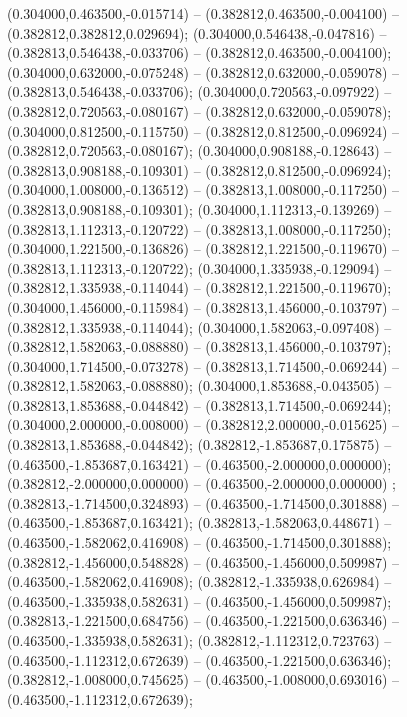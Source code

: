  (0.304000,0.463500,-0.015714) -- (0.382812,0.463500,-0.004100) -- (0.382812,0.382812,0.029694);
 (0.304000,0.546438,-0.047816) -- (0.382813,0.546438,-0.033706) -- (0.382812,0.463500,-0.004100);
 (0.304000,0.632000,-0.075248) -- (0.382812,0.632000,-0.059078) -- (0.382813,0.546438,-0.033706);
 (0.304000,0.720563,-0.097922) -- (0.382812,0.720563,-0.080167) -- (0.382812,0.632000,-0.059078);
 (0.304000,0.812500,-0.115750) -- (0.382812,0.812500,-0.096924) -- (0.382812,0.720563,-0.080167);
 (0.304000,0.908188,-0.128643) -- (0.382813,0.908188,-0.109301) -- (0.382812,0.812500,-0.096924);
 (0.304000,1.008000,-0.136512) -- (0.382813,1.008000,-0.117250) -- (0.382813,0.908188,-0.109301);
 (0.304000,1.112313,-0.139269) -- (0.382813,1.112313,-0.120722) -- (0.382813,1.008000,-0.117250);
 (0.304000,1.221500,-0.136826) -- (0.382812,1.221500,-0.119670) -- (0.382813,1.112313,-0.120722);
 (0.304000,1.335938,-0.129094) -- (0.382812,1.335938,-0.114044) -- (0.382812,1.221500,-0.119670);
 (0.304000,1.456000,-0.115984) -- (0.382813,1.456000,-0.103797) -- (0.382812,1.335938,-0.114044);
 (0.304000,1.582063,-0.097408) -- (0.382812,1.582063,-0.088880) -- (0.382813,1.456000,-0.103797);
 (0.304000,1.714500,-0.073278) -- (0.382813,1.714500,-0.069244) -- (0.382812,1.582063,-0.088880);
 (0.304000,1.853688,-0.043505) -- (0.382813,1.853688,-0.044842) -- (0.382813,1.714500,-0.069244);
 (0.304000,2.000000,-0.008000) -- (0.382812,2.000000,-0.015625) -- (0.382813,1.853688,-0.044842);
 (0.382812,-1.853687,0.175875) -- (0.463500,-1.853687,0.163421) -- (0.463500,-2.000000,0.000000);
 (0.382812,-2.000000,0.000000) -- (0.463500,-2.000000,0.000000) ;
 (0.382813,-1.714500,0.324893) -- (0.463500,-1.714500,0.301888) -- (0.463500,-1.853687,0.163421);
 (0.382813,-1.582063,0.448671) -- (0.463500,-1.582062,0.416908) -- (0.463500,-1.714500,0.301888);
 (0.382812,-1.456000,0.548828) -- (0.463500,-1.456000,0.509987) -- (0.463500,-1.582062,0.416908);
 (0.382812,-1.335938,0.626984) -- (0.463500,-1.335938,0.582631) -- (0.463500,-1.456000,0.509987);
 (0.382813,-1.221500,0.684756) -- (0.463500,-1.221500,0.636346) -- (0.463500,-1.335938,0.582631);
 (0.382812,-1.112312,0.723763) -- (0.463500,-1.112312,0.672639) -- (0.463500,-1.221500,0.636346);
 (0.382812,-1.008000,0.745625) -- (0.463500,-1.008000,0.693016) -- (0.463500,-1.112312,0.672639);
